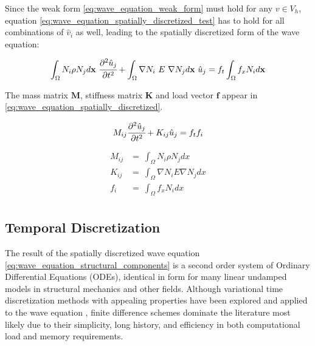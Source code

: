 Since the weak form \ref{eq:wave_equation_weak_form} must hold for any $v \in V_h$, equation \ref{eq:wave_equation_spatially_discretized_test} has to hold for all combinations of $\hat v_i$ as well, leading to the spatially discretized form of the wave equation:

\begin{equation} \label{eq:wave_equation_spatially_discretized}
	\int_{\Omega} N_i \rho N_j d \mathbf x \ \cfrac{\partial^2 \hat u_j}{\partial t^2}
	+
	\int_{\Omega} \nabla N_i \ E \ \nabla N_j d \mathbf x \ \hat u_j
	=
	f_t \int_{\Omega} f_x N_i d \mathbf x
\end{equation}

The mass matrix $\mathbf M$, stiffness matrix $\mathbf K$ and load vector $\mathbf f$ appear in \ref{eq:wave_equation_spatially_discretized}.

\begin{equation} \label{eq:wave_equation_structural_components}
M_{ij} \cfrac{\partial^2 \hat u_j}{\partial t^2}
+
K_{ij} \hat u_j
=
f_t f_i
\end{equation}

\begin{equation} \label{eq:structural_components}
	\begin{array}{rl}
		M_{ij} &= \ \int_{\Omega} N_i \rho N_j dx \\
		K_{ij} &= \ \int_{\Omega} \nabla N_i E \nabla N_j dx \\
		f_{i}  &= \ \int_{\Omega} f_x N_i dx \\
	\end{array}
\end{equation}

\subsection{Temporal Discretization}
\label{subsection:wave_equation_temporal_discretization}

The result of the spatially discretized wave equation \ref{eq:wave_equation_structural_components} is a second order system of Ordinary Differential Equations (ODEs), identical in form for many linear undamped models in structural mechanics and other fields. Although variational time discretization methods with appealing properties have been explored \cite{Zhao2014} and applied to the wave equation \cite{Kocher2014}, finite difference schemes dominate the literature most likely due to their simplicity, long history, and efficiency in both computational load and memory requirements.

